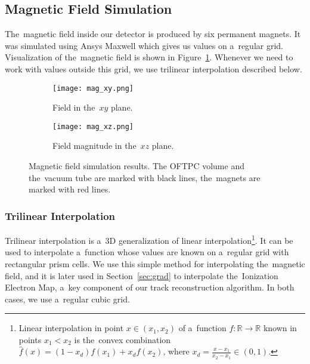 		\subsection{Magnetic Field Simulation}
		\label{sec:mag}
			The~magnetic field inside our detector is produced by six permanent magnets. It was simulated using Ansys Maxwell which gives us values on a~regular grid. Visualization of the~magnetic field is shown in Figure~\ref{fig:mag}. Whenever we need to work with values outside this grid, we use trilinear interpolation described below.
			
			\begin{figure}
				\centering
				\begin{subfigure}[t]{0.45\textwidth}
					\centering
					\texttt{[image: mag\_xy.png]}
					\caption{Field in the~$xy$ plane.}
				\end{subfigure}
				\hfill
				\begin{subfigure}[t]{0.45\textwidth}
					\centering
					\texttt{[image: mag\_xz.png]}
					\caption{Field magnitude in the~$xz$ plane.}
				\end{subfigure}
				\caption{Magnetic field simulation results. The \ac{OFTPC} volume and the~vacuum tube are marked with black lines, the~magnets are marked with red lines.}
				\label{fig:mag}
			\end{figure}
		
			\subsubsection{Trilinear Interpolation}
			\label{sec:trilin}
				Trilinear interpolation is a~3D generalization of linear interpolation\footnote{Linear interpolation in point $x\in(x_1,x_2)$ of a~function $f\colon\mathbb{R}\to\mathbb{R}$ known in points $x_1 < x_2$ is the~convex combination $\widehat{f}(x) = (1-x_d)f(x_1)+x_d f(x_2)$, where $x_d = \frac{x-x_1}{x_2-x_1} \in (0,1)$.}. It can be used to interpolate a~function whose values are known on a~regular grid with rectangular prism cells. We use this simple method for interpolating the~magnetic field, and it is later used in Section~\ref{sec:grad} to interpolate the~Ionization Electron Map, a~key component of our track reconstruction algorithm. In both cases, we use a~regular cubic grid.
				
